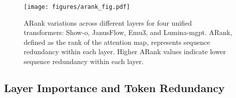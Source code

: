 




% 



\begin{figure*}[t]
    \centering
    \texttt{[image: figures/arank\_fig.pdf]}
    \vspace{-15pt}
    \caption{ARank variations across different layers for four unified transformers: Show-o, JanusFlow, Emu3, and Lumina-mgpt. ARank, defined as the rank of the attention map, represents sequence redundancy within each layer. Higher ARank values indicate lower sequence redundancy within each layer. }
    \label{fig:arank_showo}
    \vspace{-10pt}
\end{figure*}





\subsection{Layer Importance and Token Redundancy}
\label{sec:topk_selection}






